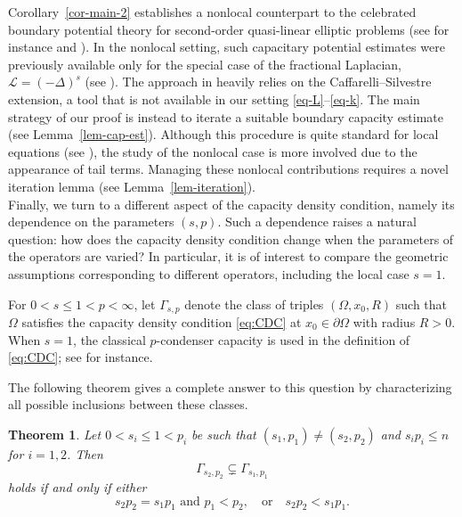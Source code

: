 \documentclass[11pt]{amsart}
\theoremstyle{plain}
\newtheorem{theorem}{Theorem}[section]
\theoremstyle{definition}
\numberwithin{equation}{section}
\begin{document}
Corollary~\ref{cor-main-2} establishes a nonlocal counterpart to the celebrated boundary potential theory for second-order quasi-linear elliptic problems (see for instance \cite{GaZi77} and \cite[Theorem~6.18]{HKM06}). In the nonlocal setting, such capacitary potential estimates were previously available only for the special case of the fractional Laplacian, $\mathcal{L} = (-\Delta)^s$ (see \cite{Bjo24}). The approach in \cite{Bjo24} heavily relies on the Caffarelli--Silvestre extension, a tool that is not available in our setting \eqref{eq-L}--\eqref{eq-k}. The main strategy of our proof is instead to iterate a suitable boundary capacity estimate (see Lemma~\ref{lem-cap-est}). Although this procedure is quite standard for local equations (see \cite{GaZi77,HKM06,MaZi97}), the study of the nonlocal case is more involved due to the appearance of tail terms. Managing these nonlocal contributions requires a novel iteration lemma (see Lemma~\ref{lem-iteration}).\\

Finally, we turn to a different aspect of the capacity density condition, namely its dependence on the parameters $(s, p)$. Such a dependence raises a natural question: how does the capacity density condition change when the parameters of the operators are varied? In particular, it is of interest to compare the geometric assumptions corresponding to different operators, including the local case $s=1$.

For $0<s\leq 1<p<\infty$, let $\Gamma_{s, p}$ denote the class of triples $(\Omega, x_0, R)$ such that $\Omega$ satisfies the capacity density condition \eqref{eq:CDC} at $x_0 \in \partial \Omega$ with radius $R>0$. When $s=1$, the classical $p$-condenser capacity is used in the definition of \eqref{eq:CDC}; see \cite[Chapter~2]{HKM06} for instance.

The following theorem gives a complete answer to this question by characterizing all possible inclusions between these classes.

\begin{theorem}\label{thm-CDC-comparison}
Let $0<s_i\leq 1<p_i$ be such that $(s_1, p_1) \neq (s_2, p_2)$ and $s_ip_i \leq n$ for $i=1, 2$. Then
\begin{equation}\label{eq-inclusion}
\Gamma_{s_2, p_2} \subsetneq \Gamma_{s_1, p_1}
\end{equation}
holds if and only if either
\begin{equation}\label{eq-sp-comp}
s_2p_2=s_1p_1\text{ and }p_1<p_2, \quad\text{or} \quad s_2p_2 < s_1p_1.
\end{equation}
\end{theorem}
\end{document}
